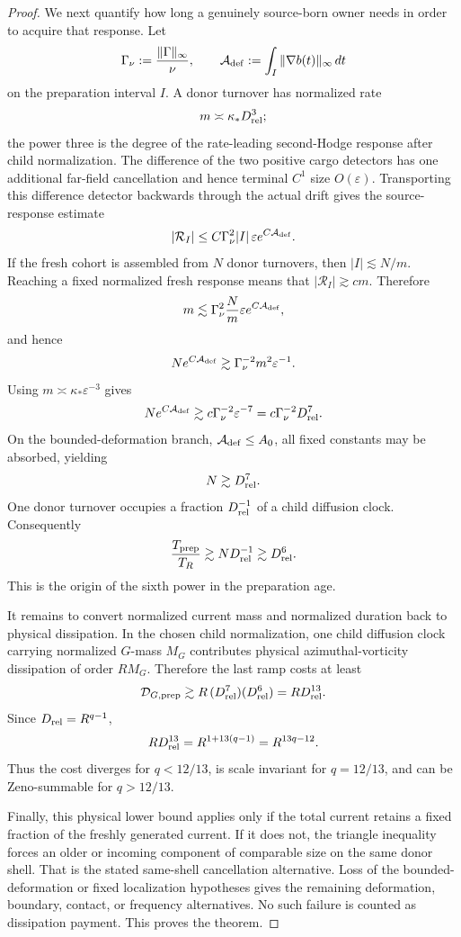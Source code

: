 \documentclass[11pt]{article}
\theoremstyle{definition}\newtheorem{definition}[theorem]{Definition}
\theoremstyle{remark}\newtheorem{remark}[theorem]{Remark}
\begin{document}
\begin{proof}
We next quantify how long a genuinely source-born owner needs in order to
acquire that response.  Let
\[
 \Gamma_\nu:=\frac{\|\Gamma\|_\infty}{\nu},
 \qquad
 \mathcal A_{\rm def}:=\int_I\|\nabla b(t)\|_\infty\,dt
\]
on the preparation interval $I$.  A donor turnover has normalized rate
\[
 m\asymp \kappa_*D_{\rm rel}^{3};
\]
the power three is the degree of the rate-leading second-Hodge response after
child normalization.  The difference of the two positive cargo detectors has
one additional far-field cancellation and hence terminal $C^1$ size
$O(\varepsilon)$.  Transporting this difference detector backwards through the
actual drift gives the source-response estimate
\[
 |\mathcal R_I|
 \le C\Gamma_\nu^2|I|\,\varepsilon
 e^{C\mathcal A_{\rm def}}.
\]
If the fresh cohort is assembled from $N$ donor turnovers, then
$|I|\lesssim N/m$.  Reaching a fixed normalized fresh response means that
$|\mathcal R_I|\gtrsim c m$.  Therefore
\[
 m
 \lesssim
 \Gamma_\nu^2\frac{N}{m}\varepsilon e^{C\mathcal A_{\rm def}},
\]
and hence
\[
 N e^{C\mathcal A_{\rm def}}
 \gtrsim
 \Gamma_\nu^{-2}m^2\varepsilon^{-1}.
\]
Using $m\asymp\kappa_*\varepsilon^{-3}$ gives
\[
 N e^{C\mathcal A_{\rm def}}
 \gtrsim c\Gamma_\nu^{-2}\varepsilon^{-7}
 =c\Gamma_\nu^{-2}D_{\rm rel}^7.
\]
On the bounded-deformation branch, $\mathcal A_{\rm def}\le A_0$, all fixed
constants may be absorbed, yielding
\[
 N\gtrsim D_{\rm rel}^7.
\]
One donor turnover occupies a fraction $D_{\rm rel}^{-1}$ of a child diffusion
clock.  Consequently
\[
 \frac{T_{\rm prep}}{T_R}
 \gtrsim ND_{\rm rel}^{-1}
 \gtrsim D_{\rm rel}^{6}.
\]
This is the origin of the sixth power in the preparation age.

It remains to convert normalized current mass and normalized duration back to
physical dissipation.  In the chosen child normalization, one child diffusion
clock carrying normalized $G$-mass $M_G$ contributes physical
azimuthal-vorticity dissipation of order $R M_G$.  Therefore the last ramp
costs at least
\[
 \mathcal D_{G,\rm prep}
 \gtrsim
 R\,(D_{\rm rel}^7)(D_{\rm rel}^6)
 =R D_{\rm rel}^{13}.
\]
Since $D_{\rm rel}=R^{q-1}$,
\[
 R D_{\rm rel}^{13}
 =R^{1+13(q-1)}
 =R^{13q-12}.
\]
Thus the cost diverges for $q<12/13$, is scale invariant for $q=12/13$, and
can be Zeno-summable for $q>12/13$.

Finally, this physical lower bound applies only if the total current retains a
fixed fraction of the freshly generated current.  If it does not, the triangle
inequality forces an older or incoming component of comparable size on the
same donor shell.  That is the stated same-shell cancellation alternative.
Loss of the bounded-deformation or fixed localization hypotheses gives the
remaining deformation, boundary, contact, or frequency alternatives.  No such
failure is counted as dissipation payment.  This proves the theorem.
\end{proof}
\end{document}
